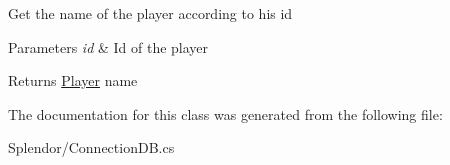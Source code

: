 Get the name of the player according to his id 


\begin{DoxyParams}{Parameters}
{\em id} & Id of the player\\
\hline
\end{DoxyParams}
\begin{DoxyReturn}{Returns}
\hyperlink{class_splendor_1_1_player}{Player} name
\end{DoxyReturn}


The documentation for this class was generated from the following file\+:\begin{DoxyCompactItemize}
\item 
Splendor/Connection\+D\+B.\+cs\end{DoxyCompactItemize}
